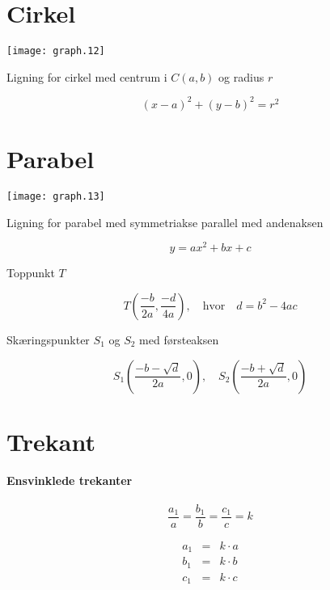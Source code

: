 \documentclass[11pt,a4paper,landscape,twocolumn,fleqn,leqno]{article}
\begin{document}
\vfill

\section{Cirkel}

\texttt{[image: graph.12]}

Ligning for cirkel med centrum i $C(a,b)$ og radius $r$

\begin{equation}
(x-a)^2 + (y-b)^2 = r^2
\end{equation}

\newpage

\section{Parabel}

\texttt{[image: graph.13]}

Ligning for parabel med symmetriakse parallel med andenaksen

\begin{equation}
y = ax^2 + bx +c
\end{equation}

Toppunkt $T$

\begin{equation}
T\left(\frac{-b}{2a}, \frac{-d}{4a}\right), \quad \text{hvor} \quad d = b^2 - 4ac
\end{equation}

Skæringspunkter $S_1$ og $S_2$ med førsteaksen

\begin{equation}
S_1\left(\frac{-b - \sqrt{d}}{2a}, 0\right), \quad S_2\left(\frac{-b + \sqrt{d}}{2a}, 0\right)
\end{equation}

\newpage

\section{Trekant}

\paragraph{Ensvinklede trekanter}

\begin{equation}
\frac{a_1}{a} = \frac{b_1}{b} = \frac{c_1}{c} = k
\end{equation}

\begin{eqnarray}
a_1 & = & k \cdot a \\
b_1 & = & k \cdot b \nonumber \\
c_1 & = & k \cdot c \nonumber
\end{eqnarray}
\end{document}

